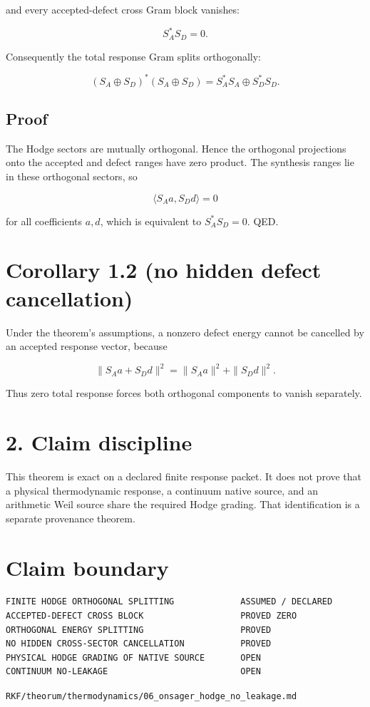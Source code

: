 and every accepted-defect cross Gram block vanishes:

\[
\boxed{S_A^*S_D=0.}
\]

Consequently the total response Gram splits orthogonally:

\[
(S_A\oplus S_D)^*(S_A\oplus S_D)
=
S_A^*S_A\oplus S_D^*S_D.
\]

\hypertarget{proof}{%
\subsection{Proof}\label{proof}}

The Hodge sectors are mutually orthogonal. Hence the orthogonal projections onto the accepted and defect ranges have zero product. The synthesis ranges lie in these orthogonal sectors, so

\[
\langle S_Aa,S_Dd\rangle=0
\]

for all coefficients \(a,d\), which is equivalent to \(S_A^*S_D=0\). QED.

\hypertarget{corollary-1.2-no-hidden-defect-cancellation}{%
\section{Corollary 1.2 (no hidden defect cancellation)}\label{corollary-1.2-no-hidden-defect-cancellation}}

Under the theorem's assumptions, a nonzero defect energy cannot be cancelled by an accepted response vector, because

\[
\|S_Aa+S_Dd\|^2
=
\|S_Aa\|^2+
\|S_Dd\|^2.
\]

Thus zero total response forces both orthogonal components to vanish separately.

\hypertarget{claim-discipline}{%
\section{2. Claim discipline}\label{claim-discipline}}

This theorem is exact on a declared finite response packet. It does not prove that a physical thermodynamic response, a continuum native source, and an arithmetic Weil source share the required Hodge grading. That identification is a separate provenance theorem.

\hypertarget{claim-boundary}{%
\section{Claim boundary}\label{claim-boundary}}

\begin{verbatim}
FINITE HODGE ORTHOGONAL SPLITTING             ASSUMED / DECLARED
ACCEPTED-DEFECT CROSS BLOCK                   PROVED ZERO
ORTHOGONAL ENERGY SPLITTING                   PROVED
NO HIDDEN CROSS-SECTOR CANCELLATION           PROVED
PHYSICAL HODGE GRADING OF NATIVE SOURCE       OPEN
CONTINUUM NO-LEAKAGE                          OPEN
\end{verbatim}

\begin{flushright}\small\texttt{RKF/theorum/thermodynamics/06\_onsager\_hodge\_no\_leakage.md}\end{flushright}
